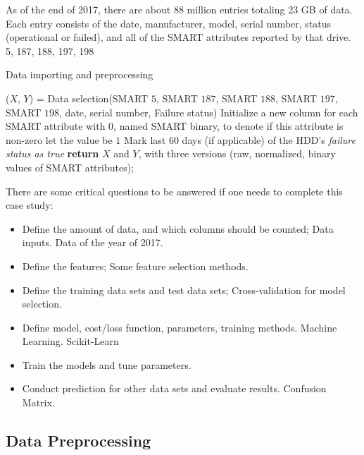 \documentclass[12pt,a4paper,english]{amsart}
\begin{document}
As of the end of 2017, there are about 88 million entries totaling 23 GB of data. Each entry consists of the date, manufacturer, model, serial number, status (operational or failed), and all of the SMART attributes reported by that drive. 
5, 187, 188, 197, 198
\begin{algorithm}  
	\caption{Data importing and preprocessing}
	\LinesNumbered  
	($X$, $Y$) = Data selection(SMART $5$, SMART $187$, SMART $188$, SMART $197$, SMART $198$, date, serial number, Failure status)\;  
	Initialize a new column for each SMART attribute with $0$, named SMART binary, to denote if this attribute is non-zero  \;
	{
		let the value be $1$
	}
	{  
		Mark last $60$ days (if applicable) of the HDD's \textit{failure status as true} \;  
	}
	\textbf{return} $X$ and $Y$, with three versions (raw, normalized, binary values of SMART attributes);
\end{algorithm}  


There are some critical questions to be answered if one needs to complete this case study:

\begin{itemize}
	\item Define the amount of data, and which columns should be counted; Data inputs.
			Data of the year of 2017.
	\item Define the features; Some feature selection methods.
	\item Define the training data sets and test data sets; Cross-validation for model selection.
	\item Define model, cost/loss function, parameters, training methods. Machine Learning. Scikit-Learn
	\item Train the models and tune parameters.
	\item Conduct prediction for other data sets and evaluate results. Confusion Matrix.
\end{itemize}

\subsection{Data Preprocessing}
\end{document}
